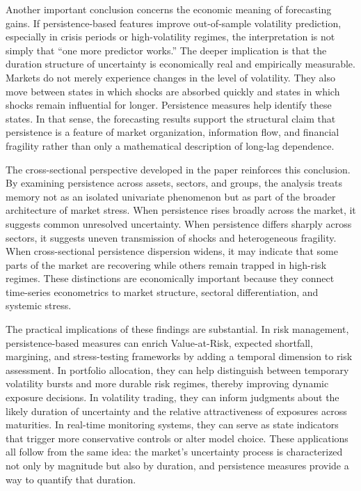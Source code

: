 \documentclass[12pt]{article}
\begin{document}
Another important conclusion concerns the economic meaning of forecasting gains. If persistence-based features improve out-of-sample volatility prediction, especially in crisis periods or high-volatility regimes, the interpretation is not simply that ``one more predictor works.'' The deeper implication is that the duration structure of uncertainty is economically real and empirically measurable. Markets do not merely experience changes in the level of volatility. They also move between states in which shocks are absorbed quickly and states in which shocks remain influential for longer. Persistence measures help identify these states. In that sense, the forecasting results support the structural claim that persistence is a feature of market organization, information flow, and financial fragility rather than only a mathematical description of long-lag dependence.

The cross-sectional perspective developed in the paper reinforces this conclusion. By examining persistence across assets, sectors, and groups, the analysis treats memory not as an isolated univariate phenomenon but as part of the broader architecture of market stress. When persistence rises broadly across the market, it suggests common unresolved uncertainty. When persistence differs sharply across sectors, it suggests uneven transmission of shocks and heterogeneous fragility. When cross-sectional persistence dispersion widens, it may indicate that some parts of the market are recovering while others remain trapped in high-risk regimes. These distinctions are economically important because they connect time-series econometrics to market structure, sectoral differentiation, and systemic stress.

The practical implications of these findings are substantial. In risk management, persistence-based measures can enrich Value-at-Risk, expected shortfall, margining, and stress-testing frameworks by adding a temporal dimension to risk assessment. In portfolio allocation, they can help distinguish between temporary volatility bursts and more durable risk regimes, thereby improving dynamic exposure decisions. In volatility trading, they can inform judgments about the likely duration of uncertainty and the relative attractiveness of exposures across maturities. In real-time monitoring systems, they can serve as state indicators that trigger more conservative controls or alter model choice. These applications all follow from the same idea: the market's uncertainty process is characterized not only by magnitude but also by duration, and persistence measures provide a way to quantify that duration.
\end{document}
